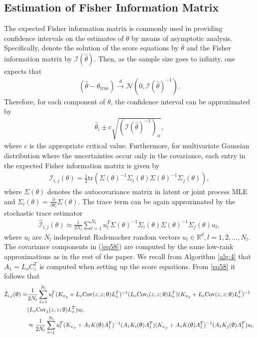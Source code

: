\documentclass[article,ij4uq]{ij4uq}              %
\begin{document}
\subsection{Estimation of Fisher Information Matrix}\label{sec:43}
\par The expected Fisher information matrix is commonly used in providing confidence intervals on the estimates of $\theta$ by means of asymptotic analysis. Specifically, denote the solution of the score equations by $\hat{\theta}$ and the Fisher information matrix by $\mathcal{I}(\hat{\theta})$. Then, as the sample size goes to infinity, one expects that 
\begin{align}
    (\hat{\theta}-\theta_{\mathrm{true}})\xrightarrow{d}\mathcal{N}(0,\mathcal{I}(\hat{\theta})^{-1}).\label{eq55}
\end{align}
Therefore, for each component of $\theta$, the confidence interval can be approximated by
\begin{align}
    \hat{\theta}_{i}\pm c\sqrt{(\mathcal{I}(\hat{\theta})^{-1})_{ii}},\label{eq56}
\end{align}
where $c$ is the appropriate critical value. Furthermore, for multivariate Gaussian distribution where the uncertainties occur only in the covariance, each entry in the expected Fisher information matrix is given by \cite{stein2013stochastic}
\begin{align}
    \mathcal{I}_{i,j}(\theta)=\frac{1}{2}\mathrm{tr}(\Sigma(\theta)^{-1}\Sigma_{i}(\theta)\Sigma(\theta)^{-1}\Sigma_{j}(\theta)),\label{eq57}
\end{align}
where $\Sigma(\theta)$ denotes the autocovariance matrix in latent or joint process MLE and $\Sigma_{i}(\theta)=\frac{\partial}{\partial \theta_{i}}\Sigma(\theta)$. The trace term can be again approximated by the stochastic trace estimator
\begin{align}
    \hat{\mathcal{I}}_{i,j}(\theta)\approx\frac{1}{2N_{l}}\sum_{l=1}^{N_{l}}u_{l}^{T}\Sigma(\theta)^{-1}\Sigma_{i}(\theta)\Sigma(\theta)^{-1}\Sigma_{j}(\theta)u_{l},\label{eq58}
\end{align}
where $u_l$ are $N_l$ independent Rademacher random vectors $u_{l} \in \mathbb{R}^d, l=1,2,\ldots,N_l$. 
The covariance components in (\ref{eq58}) are computed by the same low-rank approximations as in the rest of the paper. We recall from Algorithm \ref{alg:4} that $A_{1}=L_{o}C_{z}^{T}$ is computed when setting up the score equations. From \eqref{eq58} it follows that
\begin{align}
    \hat{\mathcal{I}}_{i,j}(\theta)\approx&\frac{1}{2N_{l}}\sum_{l=1}^{N_{l}}u_{l}^{T}(K_{\epsilon_{y}}+L_{o}\mathrm{Cov}(z,z;\theta)L_{o}^{T})^{-1}(L_{o}\mathrm{Cov}_{i}(z,z;\theta)L_{o}^{T})(K_{\epsilon_{y}}+L_{o}\mathrm{Cov}(z,z;\theta)L_{o}^{T})^{-1}\notag\\
    &(L_{o}\mathrm{Cov}_{j}(z,z;\theta)L_{o}^{T})u_{l}.\notag\\
    &\approx\frac{1}{2N_{l}}\sum_{l=1}^{N_{l}}u_{l}^{T}(K_{\epsilon_{y}}+A_{1}K(\theta)A_{1}^{T})^{-1}(A_{1}K_{i}(\theta)A_{1}^{T})(K_{\epsilon_{y}}+A_{1}K(\theta)A_{1}^{T})^{-1}(A_{1}K_{j}(\theta)A_{1}^{T})u_{l}.
    \label{eq:latent}
\end{align}
\end{document}
